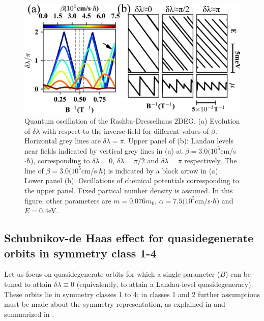 \documentclass[aps, prb, showpacs, twocolumn, notitlepage, superscriptaddress]{revtex4-1}
\begin{document}
\begin{figure}
\includegraphics[width=1.0\columnwidth]{qo.png}
\caption{Quantum oscillation of the Rashba-Dresselhaus 2DEG. (a) Evolution of $\delta\lambda$ with respect to the inverse field for different values of $\beta$. Horizontal grey lines are $\delta\lambda=\pi$. Upper panel of (b): Landau levels near fields indicated by vertical grey lines in (a) at $\beta=3.0(10^{5}$cm/s$\cdot\hbar$), corresponding to $\delta\lambda=0$, $\delta\lambda=\pi/2$ and $\delta\lambda=\pi$ respectively. The line of $\beta=3.0(10^{5}$cm/s$\cdot\hbar$) is indicated by a black arrow in (a). Lower panel (b): Oscillations of chemical potentials corresponding to the upper panel. Fixed partical number density is assumed. In this figure, other parameters are $m=0.076m_0$, $\alpha=7.5(10^{5}$cm/s$\cdot\hbar$) and $E=0.4$eV.
\label{fig:qo}}
\end{figure}



\subsection{Schubnikov-de Haas effect for quasidegenerate orbits in symmetry class 1-4}\label{sec:quantosc_quasideg}

Let us focus on quasidegenerate orbits for which a single parameter ($B$) can be tuned to attain $\delta \lambda{\equiv}0$ (equivalently, to attain a Landau-level quasidegeneracy). These orbits lie in symmetry classes 1 to 4; in classes 1 and 2 further assumptions must be made about the symmetry representation, as explained in  and summarized in .
\end{document}
